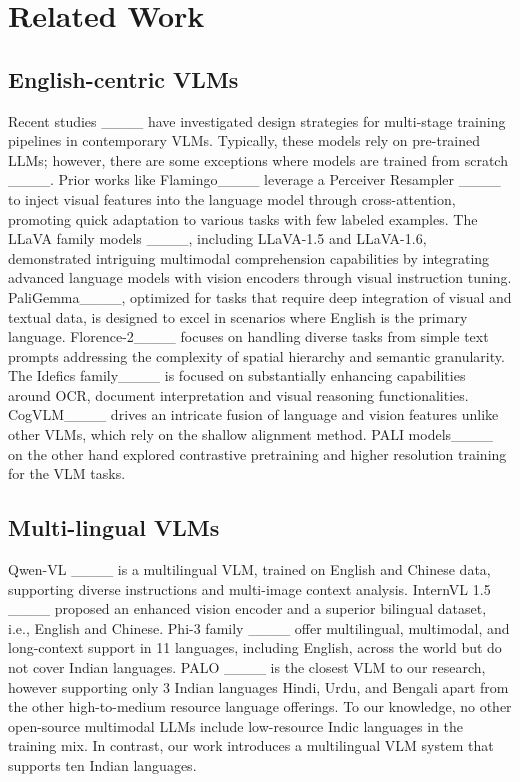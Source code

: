 \section{Related Work}
\label{sec:relwork}

\subsection{English-centric VLMs}
Recent studies ____ have investigated design strategies for multi-stage training pipelines in contemporary VLMs. Typically, these models rely on pre-trained LLMs; however, there are some exceptions where models are trained from scratch ____. Prior works like Flamingo____ leverage a Perceiver Resampler ____ to inject visual features into the language model through cross-attention, promoting quick adaptation to various tasks with few labeled examples. The LLaVA family models ____, including LLaVA-1.5 and LLaVA-1.6, demonstrated intriguing multimodal comprehension capabilities by integrating advanced language models with vision encoders through visual instruction tuning. 
PaliGemma____, optimized for tasks that require deep integration of visual and textual data, is designed to excel in scenarios where English is the primary language. Florence-2____ focuses on handling diverse tasks from simple text prompts addressing the complexity of spatial hierarchy and semantic granularity. The Idefics family____ is focused on substantially enhancing capabilities around OCR, document interpretation and visual reasoning functionalities. CogVLM____ drives an intricate fusion of language and vision features unlike other 
VLMs, which rely on the shallow alignment method. PALI models____ on the other hand explored contrastive pretraining and higher resolution training for the VLM tasks. 


\subsection{Multi-lingual VLMs}
Qwen-VL ____ is a multilingual VLM, trained on English and Chinese data, supporting diverse instructions and multi-image context analysis. InternVL 1.5 ____ proposed an enhanced vision encoder and a superior bilingual dataset, i.e., English and Chinese. Phi-3 family ____ offer multilingual, multimodal, and long-context support in 11 languages, including English, across the world but do not cover Indian languages. PALO ____ is the closest VLM to our research, however supporting only 3 Indian languages Hindi, Urdu, and Bengali apart from the other high-to-medium resource language offerings. To our knowledge, no other open-source multimodal LLMs include low-resource Indic languages in the training mix. In contrast, our work introduces a multilingual VLM system that supports ten Indian languages.


